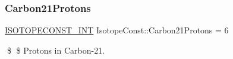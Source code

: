 \subsubsection{\texorpdfstring{Carbon21\+Protons}{Carbon21Protons}}
{\footnotesize\ttfamily \mbox{\hyperlink{group___isotope_const-_macros_ga5f18360b3e99483a35c32d789e62621c}{I\+S\+O\+T\+O\+P\+E\+C\+O\+N\+S\+T\+\_\+\+I\+NT}} Isotope\+Const\+::\+Carbon21\+Protons = 6}

\$ \$ Protons in Carbon-\/21. 